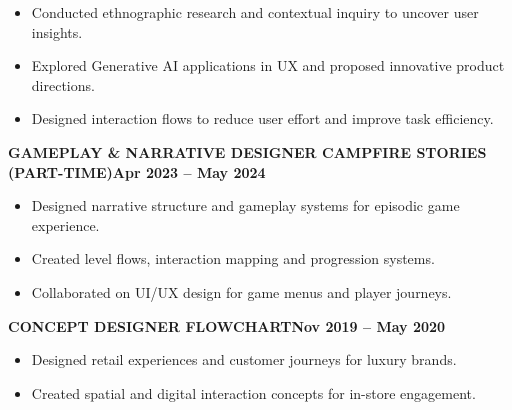 \documentclass[10pt,a4paper]{article}
\newcommand{\jobtitle}[3]{\textbf{#1}\hfill{\color{violet}\bfseries #3}\par{\color{textblack}\bfseries #2}\par\vspace{3pt}}
\begin{document}
\begin{minipage}[t][11.69in][t]{5.32in}
\begin{minipage}{4.75in}
\begin{itemize}\small
\item Conducted ethnographic research and contextual inquiry to uncover user insights.
\item Explored Generative AI applications in UX and proposed innovative product directions.
\item Designed interaction flows to reduce user effort and improve task efficiency.
\end{itemize}
\vspace{2pt}
\jobtitle{GAMEPLAY \& NARRATIVE DESIGNER \quad \textbullet{} \quad CAMPFIRE STORIES {\tiny (PART-TIME)}}{}{Apr 2023 -- May 2024}
\begin{itemize}\small
\item Designed narrative structure and gameplay systems for episodic game experience.
\item Created level flows, interaction mapping and progression systems.
\item Collaborated on UI/UX design for game menus and player journeys.
\end{itemize}
\vspace{2pt}
\jobtitle{CONCEPT DESIGNER \quad \textbullet{} \quad FLOWCHART}{}{Nov 2019 -- May 2020}
\begin{itemize}\small
\item Designed retail experiences and customer journeys for luxury brands.
\item Created spatial and digital interaction concepts for in-store engagement.
\end{itemize}
\vspace{7pt}{\color{rulegray}\rule{\linewidth}{0.6pt}}


\end{minipage}
\end{minipage}
\end{document}
